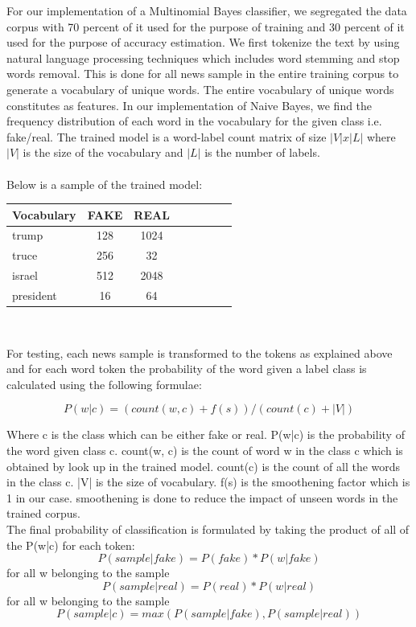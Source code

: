 \documentclass{neu_handout}
\begin{document}
For our implementation of a Multinomial Bayes classifier, we segregated the data corpus with 70 percent of it used for the purpose of training and 30 percent of it used for the purpose of accuracy estimation. We first tokenize the text by using  natural language processing techniques which includes word stemming and stop words removal. This is done for all news sample in the entire training corpus to generate a vocabulary of unique words. The entire vocabulary of unique words constitutes as features. In our implementation of Naive Bayes, we find the frequency distribution of each word in the vocabulary for the given class i.e. fake/real. The trained model is a word-label count matrix of size $|V| x |L|$ where $|V|$ is the size of the vocabulary and $|L|$ is the number of labels. \\\\

Below is a sample of the trained model:

\begin{table}[h]
\centering
\begin{tabular}{l*{6}{c}r}
Vocabulary     & FAKE & REAL \\
\hline
trump 			& 128 & 1024   \\
truce            & 256 & 32  \\
israel           & 512 & 2048  \\
president     & 16 & 64  \\
\end{tabular}\\
\end{table}

For testing, each news sample is transformed to the tokens as explained above and for each word token the probability of the word given a label class is calculated using the following formulae:

$$P(w|c) = (count(w, c) + f(s))/(count(c) + |V|)$$

Where c is the class which can be either fake or real. P(w|c) is the probability of the word given class c. count(w, c) is the count of word w in the class c which is obtained by look up in the trained model. count(c) is the count of all the words in the class c. |V| is the size of vocabulary. f(s) is the smoothening factor  which is 1 in our case. smoothening is done to reduce the impact of unseen words in the trained corpus.\\

The final probability of classification is formulated by taking the product of all of the P(w|c) for each token:\\
$$P(sample|fake) = P(fake) * P(w|fake)$$ for all w belonging to the sample
$$P(sample|real) = P(real) * P(w|real)$$ for all w belonging to the sample
$$P(sample|c) = max(P(sample|fake), P(sample|real))$$
\end{document}
